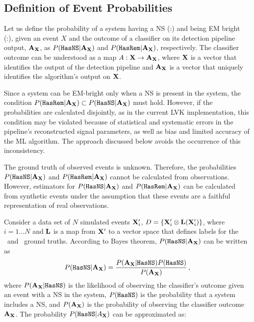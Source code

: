 \subsection{Definition of Event Probabilities} \label{bayesian_probs}

Let us define the probability of a system having a \ac{NS} (\hasns:\true) and being \ac{EM} bright (\hasrem:\true), given an event $X$ and the outcome of a classifier on its detection pipeline
output, ${\bf A}_{\bf X}$, as $P({{\tt HasNS}}|{\bf A}_{\bf X})$ and $P({{\tt HasRem}}|{\bf A}_{\bf X})$, respectively. The classifier outcome can be understood as a map $A:{\bf X}\to {\bf A}_{\bf X}$, where
$\bf X$ is a vector that identifies the output of the detection pipeline and ${\bf A}_{\bf X}$ is a vector that uniquely identifies the algorithm's output on $\bf X$. 

Since a system can be EM-bright only when a \ac{NS} is present in the system, the condition $P({{\tt HasRem}}|{\bf A}_{\bf X})\subset P({{\tt HasNS}}|{\bf A}_{\bf X})$ must hold. However, if the probabilities
are calculated disjointly, as in the current \ac{LVK} implementation, this condition may be violated because of statistical and systematic errors in the pipeline's reconstructed signal
parameters, as well as bias and limited accuracy of the \ac{ML} algorithm. The approach discussed below avoids the occurrence of this inconsistency.

The ground truth of observed events is unknown. Therefore, the probabilities $P({{\tt HasNS}}|{\bf A}_{\bf X})$ and $P({{\tt HasRem}}|{\bf A}_{\bf X})$ cannot be calculated from observations. However,
estimators for $P({{\tt HasNS}}|{\bf A}_{\bf X})$ and $P({{\tt HasRem}}|{\bf A}_{\bf X})$ can be calculated from synthetic events under the assumption that these events are a faithful representation of
real observations.

Consider a data set of $N$ simulated events ${\bf X}'_i$, $D=\{{\bf X}'_i\otimes{\bf L}({\bf X}'_i)\}$, where $i=1\dots N$ and ${\bf L}$ is a map from ${\bf X}'$ to a vector space
that defines labels for the \hasns\ and \hasrem\ ground truths. According to Bayes theorem, $P({{\tt HasNS}}|{\bf A}_{\bf X})$  can be written as 
%
\begin{equation}
P({{\tt HasNS}}|{\bf A}_{\bf X})=\frac{P({\bf A}_{\bf X}|{{\tt HasNS}})P({{\tt HasNS}})}{P({\bf A}_{\bf X})}\,,
\label{bayes}
\end{equation}
%
where $P({\bf A}_{\bf X}|{{\tt HasNS}})$ is the likelihood of observing the classifier's outcome given an event with a \ac{NS} in the system, $P({{\tt HasNS}})$ is the probability that a system includes a \ac{NS}, and $P({\bf A}_{\bf X})$ is the probability of observing the classifier outcome ${\bf A}_{\bf X}$. The probability $P({{\tt HasNS}}|A_{\bf X})$ can be approximated as:  
%

